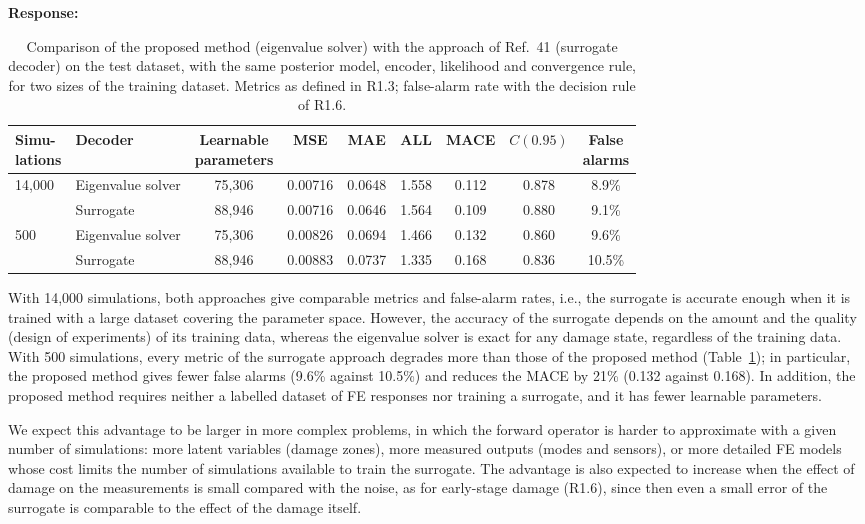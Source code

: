 \documentclass[11pt]{article}
\newenvironment{response}{\par\smallskip\noindent\color{resp}\textbf{Response:}\ }{\par}
\begin{document}
\begin{response}
	\begin{table}[H]
		\centering\small
		\caption{Comparison of the proposed method (eigenvalue solver) with the approach of Ref.~41 (surrogate decoder) on the
			test dataset, with the same posterior model, encoder, likelihood and convergence rule, for two sizes of the
			training dataset. Metrics as defined in R1.3; false-alarm rate with the decision rule of R1.6.}
		\label{tab:surrogate}
		\footnotesize
		\setlength{\tabcolsep}{4pt}
		\begin{tabular}{llccccccc}
			\toprule
			\shortstack{Simu-\\lations} & Decoder & \shortstack{Learnable\\parameters} & MSE & MAE & ALL & MACE & $C(0.95)$ & \shortstack{False\\alarms} \\
			\midrule
			14,000 & Eigenvalue solver & 75,306 & 0.00716 & 0.0648 & 1.558 & 0.112 & 0.878 & 8.9\% \\
				   & Surrogate         & 88,946 & 0.00716 & 0.0646 & 1.564 & 0.109 & 0.880 & 9.1\% \\
			\midrule
			500    & Eigenvalue solver & 75,306 & 0.00826 & 0.0694 & 1.466 & 0.132 & 0.860 & 9.6\% \\
				   & Surrogate         & 88,946 & 0.00883 & 0.0737 & 1.335 & 0.168 & 0.836 & 10.5\% \\
			\bottomrule
		\end{tabular}
	\end{table}

	With 14,000 simulations, both approaches give comparable metrics and false-alarm rates, i.e., the surrogate is accurate enough when it is trained with a large dataset covering the parameter space. However, the accuracy of the surrogate depends on the amount and the quality (design of experiments) of its training data, whereas the eigenvalue solver is exact for any damage state, regardless of the training data. With 500 simulations, every metric of the surrogate approach degrades more than those of the proposed method (Table~\ref{tab:surrogate}); in particular, the proposed method gives fewer false alarms (9.6\% against 10.5\%) and reduces the MACE by 21\% (0.132 against 0.168). In addition, the proposed method requires neither a labelled dataset of FE responses nor training a surrogate, and it has fewer learnable parameters.

	We expect this advantage to be larger in more complex problems, in which the forward operator is harder to approximate with a given number of simulations: more latent variables (damage zones), more measured outputs (modes and sensors), or more detailed FE models whose cost limits the number of simulations available to train the surrogate. The advantage is also expected to increase when the effect of damage on the measurements is small compared with the noise, as for early-stage damage (R1.6), since then even a small error of the surrogate is comparable to the effect of the damage itself.



\end{response}
\end{document}
